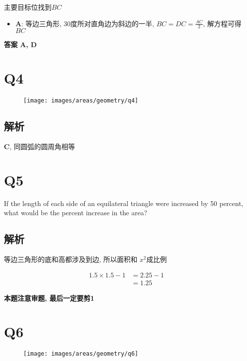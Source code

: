    主要目标位找到$ BC $

    \begin{itemize}
      \item \textbf{A}: 等边三角形, 30度所对直角边为斜边的一半,
      $ BC = DC = \frac{AC}{2} $, 解方程可得 $ BC $
    \end{itemize}

    \textbf{答案 A, D}

\section{Q4}

  \begin{figure}[H]
    \centering
    \texttt{[image: images/areas/geometry/q4]}
  \end{figure}

  \subsection{解析}

    \textbf{C}, 同圆弧的圆周角相等

\section{Q5}

  If the length of each side of an equilateral triangle were increased by
  50 percent, what would be the percent increase in the area?

  \subsection{解析}

    等边三角形的底和高都涉及到边, 所以面积和 $ x^{2} $成比例

    \begin{align*}
      1.5 \times 1.5 - 1 &= 2.25 - 1 \\
      &= 1.25
    \end{align*}

    \textbf{本题注意审题, 最后一定要剪1}

\section{Q6}

  \begin{figure}[H]
    \centering
    \texttt{[image: images/areas/geometry/q6]}
  \end{figure}

